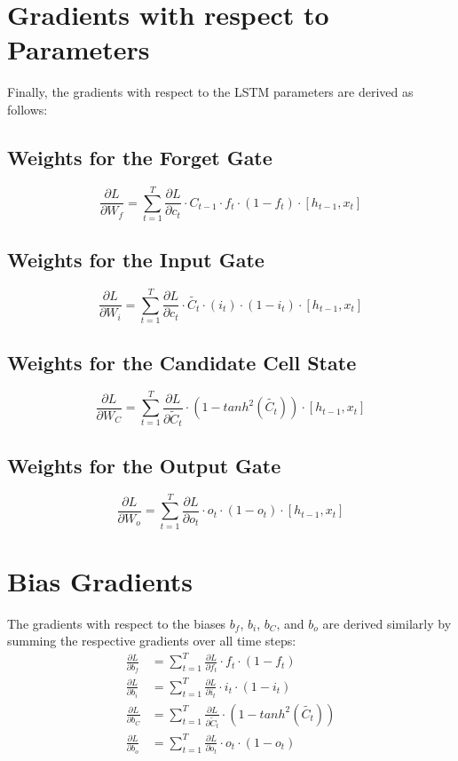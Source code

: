 \documentclass{article}
\begin{document}
\section{Gradients with respect to Parameters}
Finally, the gradients with respect to the LSTM parameters are derived as follows:

\subsection{Weights for the Forget Gate}
\begin{equation}
	\frac{\partial L}{\partial W_f} = \sum_{t=1}^{T} \frac{\partial L}{\partial c_t} \cdot C_{t-1} \cdot f_t \cdot (1-f_t) \cdot [h_{t-1},x_t]
\end{equation}

\subsection{Weights for the Input Gate}
\begin{equation}
	\frac{\partial L}{\partial W_i} = \sum_{t=1}^{T} \frac{\partial L}{\partial c_t} \cdot \tilde{C_t} \cdot (i_t)\cdot  (1-i_t) \cdot [h_{t-1},x_t]
\end{equation}

\subsection{Weights for the Candidate Cell State}
\begin{equation}
	\frac{\partial L}{\partial W_C} = \sum_{t=1}^{T} \frac{\partial L}{\partial \tilde{C}_t} \cdot (1-tanh^2(\tilde{C_t})) \cdot [h_{t-1},x_t]
\end{equation}

\subsection{Weights for the Output Gate}
\begin{equation}
	\frac{\partial L}{\partial W_o} = \sum_{t=1}^{T} \frac{\partial L}{\partial o_t} \cdot o_t \cdot (1-o_t)\cdot  [h_{t-1},x_t]
\end{equation}

\section{Bias Gradients}
The gradients with respect to the biases \(b_f\), \(b_i\), \(b_C\), and \(b_o\) are derived similarly by summing the respective gradients over all time steps:
\begin{align}
	\frac{\partial L}{\partial b_f} &= \sum_{t=1}^{T} \frac{\partial L}{\partial f_t} \cdot f_t \cdot (1-f_t)\\
	\frac{\partial L}{\partial b_i} &= \sum_{t=1}^{T} \frac{\partial L}{\partial i_t} \cdot i_t \cdot (1-i_t) \\
	\frac{\partial L}{\partial b_C} &= \sum_{t=1}^{T} \frac{\partial L}{\partial \tilde{C}_t} \cdot (1 - tanh^2 (\tilde{C_t}))\\
	\frac{\partial L}{\partial b_o} &= \sum_{t=1}^{T} \frac{\partial L}{\partial o_t} \cdot o_t \cdot (1-o_t)
\end{align}
\end{document}
